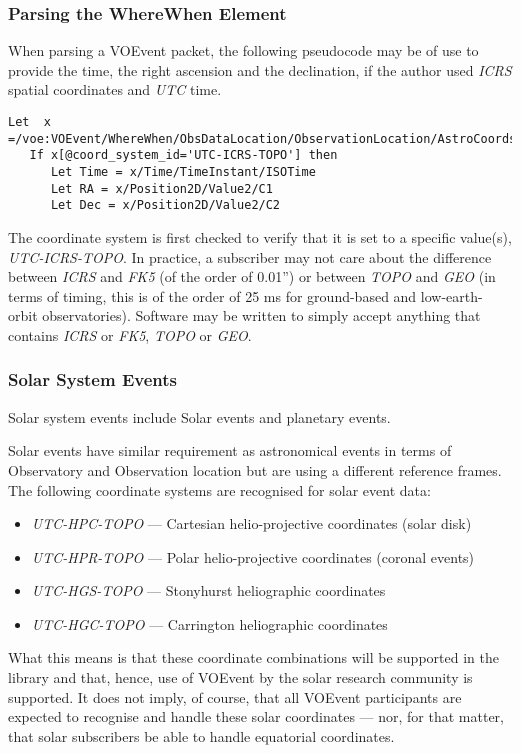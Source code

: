 \documentclass[11pt,a4paper]{ivoa}
\begin{document}
\subsubsection{Parsing the WhereWhen Element}
\label{sec:3.4.3}
When parsing a VOEvent packet, the following pseudocode may be of use to provide
the time, the right ascension and the declination, if the author used
\emph{ICRS} spatial coordinates and \emph{UTC} time.
\begin{lstlisting}
Let  x =/voe:VOEvent/WhereWhen/ObsDataLocation/ObservationLocation/AstroCoords
   If x[@coord_system_id='UTC-ICRS-TOPO'] then
      Let Time = x/Time/TimeInstant/ISOTime
      Let RA = x/Position2D/Value2/C1
      Let Dec = x/Position2D/Value2/C2
\end{lstlisting}

The coordinate system is first checked to verify that it is set to a specific
value(s), \emph{UTC-ICRS-TOPO}. In practice, a subscriber may not care about the
difference between \emph{ICRS} and \emph{FK5} (of the order of 0.01'') or
between \emph{TOPO} and \emph{GEO} (in terms of timing, this is of the order of
25 ms for ground-based and low-earth-orbit observatories). Software may be
written to simply accept anything that contains \emph{ICRS} or \emph{FK5},
\emph{TOPO} or \emph{GEO}.


\subsubsection{Solar System Events}
\label{sec:3.4.4}
Solar system events include Solar events and planetary events.

Solar events have similar requirement as astronomical events in terms of
Observatory and Observation location but are using a different reference frames.
The following coordinate systems are recognised for solar event data:
\begin{itemize}
\item \emph{UTC-HPC-TOPO} --- Cartesian helio-projective coordinates (solar disk)
\item \emph{UTC-HPR-TOPO} --- Polar helio-projective coordinates (coronal events)
\item \emph{UTC-HGS-TOPO} --- Stonyhurst heliographic coordinates
\item \emph{UTC-HGC-TOPO} --- Carrington heliographic coordinates
\end{itemize}

What this means is that these coordinate combinations will be supported in the
library and that, hence, use of VOEvent by the solar research community is
supported. It does not imply, of course, that all VOEvent participants are
expected to recognise and handle these solar coordinates --- nor, for that
matter, that solar subscribers be able to handle equatorial coordinates.
\end{document}

